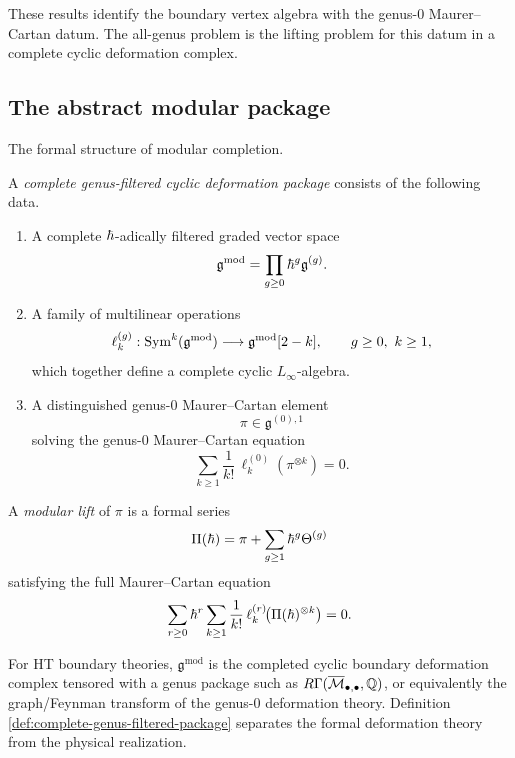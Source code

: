 These results identify the boundary vertex algebra with the genus-$0$ Maurer--Cartan datum. The all-genus problem is the lifting problem for this datum in a complete cyclic deformation complex.

\subsection{The abstract modular package}
\label{subsec:abstract-modular-package}

The formal structure of modular completion.

\begin{definition}
\label{def:complete-genus-filtered-package}
A \emph{complete genus-filtered cyclic deformation package} consists of the following data.
\begin{enumerate}[label=\textup{(\roman*)}]
\item A complete $\hbar$-adically filtered graded vector space
\[
\mathfrak g^{\mathrm{mod}}=\prod_{g\ge 0}\hbar^g\mathfrak g^{(g)}.
\]
\item A family of multilinear operations
\[
\ell_k^{(g)}: \operatorname{Sym}^k(\mathfrak g^{\mathrm{mod}})\longrightarrow
\mathfrak g^{\mathrm{mod}}[2-k],
\qquad g\ge 0,\ k\ge 1,
\]
which together define a complete cyclic $L_\infty$-algebra.
\item A distinguished genus-$0$ Maurer--Cartan element
\[
\pi\in \mathfrak g^{(0),1}
\]
solving the genus-$0$ Maurer--Cartan equation
\[
\sum_{k\ge 1}\frac1{k!}\,\ell_k^{(0)}(\pi^{\otimes k})=0.
\]
\end{enumerate}
A \emph{modular lift} of $\pi$ is a formal series
\[
\Pi(\hbar)=\pi+\sum_{g\ge 1}\hbar^g\Theta^{(g)}
\]
satisfying the full Maurer--Cartan equation
\begin{equation}
\label{eq:full-modular-mc}
\sum_{r\ge 0}\hbar^r\sum_{k\ge 1}\frac1{k!}\,
\ell_k^{(r)}\!\bigl(\Pi(\hbar)^{\otimes k}\bigr)=0.
\end{equation}
\end{definition}

\begin{remark}
For HT boundary theories, $\mathfrak g^{\mathrm{mod}}$ is the completed cyclic
boundary deformation complex tensored with a genus package such as
$R\Gamma(\overline{\mathcal M}_{\bullet,\bullet},\mathbb Q)$, or equivalently the graph/Feynman transform of the
genus-$0$ deformation theory. Definition
\ref{def:complete-genus-filtered-package} separates the formal deformation theory from the
physical realization.
\end{remark}

